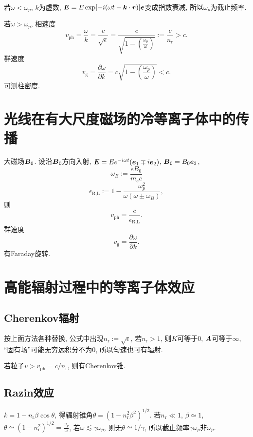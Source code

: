 若$\omega<\omega_p$, $k$为虚数, $\boldsymbol{E}=E\exp[-i(\omega t-\boldsymbol{k}\cdot\boldsymbol{r})]\boldsymbol{e}$变成指数衰减, 所以$\omega_p$为截止频率.

若$\omega>\omega_p$, 相速度
\begin{equation}
    v_\text{ph}=\frac{\omega}{k}=\frac{c}{\sqrt{\epsilon}}=\frac{c}{\sqrt{1-\left(\frac{\omega_p}{\omega}\right)}}:=\frac{c}{n_\text{r}}>c.
\end{equation}
群速度
\begin{equation}
    v_\text{g}=\frac{\partial\omega}{\partial k}=c\sqrt{1-\left(\frac{\omega_p}{\omega}\right)}<c.
\end{equation}
可测柱密度.

\section{光线在有大尺度磁场的冷等离子体中的传播}

大磁场$\boldsymbol{B}_0$. 设沿$\boldsymbol{B}_0$方向入射, $\boldsymbol{E}=Ee^{-i\omega t}(\boldsymbol{e}_1\mp i\boldsymbol{e}_2)$, $\boldsymbol{B}_0=B_0\boldsymbol{e}_3$,
\begin{equation}
    \omega_B:=\frac{eB_0}{m_ec}
\end{equation}
\begin{equation}
    \epsilon_\text{R,L}:=1-\frac{\omega_p^2}{\omega(\omega\pm\omega_B)},
\end{equation}
则
\begin{equation}
    v_\text{ph}=\frac{c}{\epsilon_\text{R,L}}.
\end{equation}
群速度
\begin{equation}
    v_\text{g}=\frac{\partial\omega}{\partial k}.
\end{equation}
有Faraday旋转.

\section{高能辐射过程中的等离子体效应}

\subsection{Cherenkov辐射}
按上面方法各种替换, 公式中出现$n_\text{r}:=\sqrt{\epsilon}$, 若$n_\text{r}>1$, 则$K$可等于$0$, $\boldsymbol{A}$可等于$\infty$, ``固有场''可能无穷远积分不为$0$, 所以匀速也可有辐射.

若粒子$v>v_\text{ph}=c/n_\text{r}$, 则有Cherenkov锥.

\subsection{Razin效应}

$k=1-n_\text{r}\beta\cos\theta$, 得辐射锥角$\theta=(1-n_\text{r}^2\beta^2)^{1/2}$. 若$n_\text{r}\ll1$, $\beta\simeq1$, $\theta\simeq(1-n_\text{r}^2)^{1/2}=\frac{\omega_p}{\omega}$, 若$\omega\lesssim\gamma\omega_p$, 则无$\theta\simeq1/\gamma$, 所以截止频率$\gamma\omega_p$非$\omega_p$.
